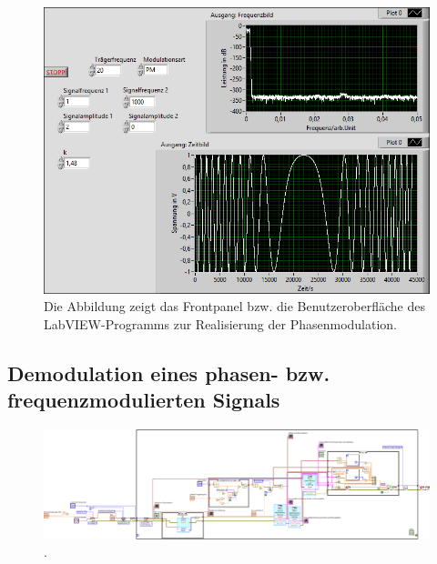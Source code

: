 \documentclass[
a4paper,
12pt,
pagesize,
ngerman
]{scrartcl}
\begin{document}
	\noindent
	
	\begin{figure}[H]
		\centering
		\includegraphics[width=1.0\textwidth]{EIRE2018Dateien/Tag4/FMPM-Erzeugung/PM-FMPM-Erzeugungp}
		\caption{Die Abbildung zeigt das Frontpanel bzw. die Benutzeroberfläche des LabVIEW-Programms zur Realisierung der Phasenmodulation.}
		\label{PMAusgabe}
	\end{figure}

	\noindent 
	
	\subsection{Demodulation eines phasen- bzw. frequenzmodulierten Signals}
	\begin{figure}[H]
		\centering
		\includegraphics[width=1.0\textwidth]{EIRE2018Dateien/Tag4/OsziFMPM-Demod/FM/OsziPlusFMPMd}
		\caption{.}
	\end{figure}
\end{document}
